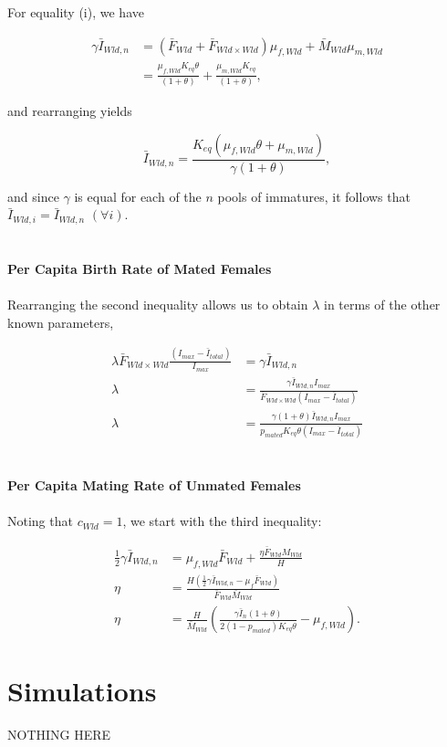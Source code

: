 \documentclass[]{article}  %
\begin{document}
For equality (i), we have

\begin{align*}
\gamma \bar{I}_{Wld, n} &= (\bar{F}_{Wld} + \bar{F}_{Wld \times Wld})\mu_{f, Wld} + \bar{M}_{Wld}\mu_{m, Wld} \\
&= \frac{\mu_{f, Wld} K_{eq} \theta}{(1 + \theta)} + \frac{\mu_{m, Wld} K_{eq}}{(1 + \theta)},
\end{align*}

\noindent and rearranging yields

$$ \bar{I}_{Wld, n} = \frac{K_{eq}(\mu_{f, Wld} \theta + \mu_{m, Wld})}{\gamma(1 + \theta)} ,$$

\noindent and since $\gamma$ is equal for each of the $n$ pools of immatures, it follows that $\bar{I}_{Wld, i} = \bar{I}_{Wld, n}$ $(\forall i)$.\\
\\
\\
{\bf Per Capita Birth Rate of Mated Females}
\\
\\
Rearranging the second inequality allows us to obtain $\lambda$ in terms of the other known parameters, 

\begin{align*}
\lambda \bar{F}_{Wld \times Wld}\frac{(I_{max} - \bar{I}_{total})}{I_{max}} &= \gamma \bar{I}_{Wld, n} \\
\lambda &= \frac{\gamma \bar{I}_{Wld, n}I_{max}}{\bar{F}_{Wld \times Wld}(I_{max} - \bar{I}_{total})} \\
\lambda &= \frac{\gamma (1 + \theta) \bar{I}_{Wld, n}I_{max}}{p_{mated}K_{eq}\theta(I_{max} - \bar{I}_{total})} 
\end{align*}
\\
\\
{\bf Per Capita Mating Rate of Unmated Females}
\\
\\
Noting that $c_{Wld} = 1$, we start with the third inequality:

\begin{align*}
\frac{1}{2}\gamma \bar{I}_{Wld, n} &= \mu_{f, Wld} \bar{F}_{Wld} + \frac{\eta \bar{F}_{Wld} M_{Wld}}{H}\\
\eta &= \frac{H(\tfrac{1}{2} \gamma \bar{I}_{Wld, n} - \mu_f \bar{F}_{Wld})}{\bar{F}_{Wld}\bar{M}_{Wld}}\\
\eta &= \frac{H}{\bar{M}_{Wld}} \left( \frac{\gamma\bar{I}_n (1 + \theta)}{2(1 - p_{mated}) K_{eq} \theta} - \mu_{f, Wld}\right).
\end{align*}


\section{Simulations}

NOTHING HERE
\end{document}
